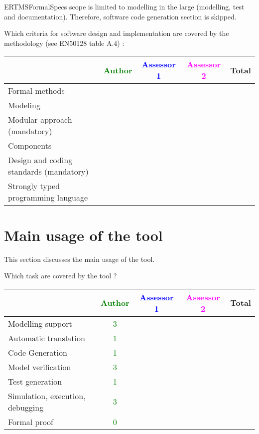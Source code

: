 \begin{author_comment}
ERTMSFormalSpecs scope is limited to modelling in the large (modelling, test and documentation). Therefore, software code generation section is skipped.  
\end{author_comment}

Which criteria for software design and implementation are covered by the methodology
(see EN50128 table A.4) :

\begin{tabular}{|l | c | c | c | c|}
\hline
& \textcolor{green}{Author} & \textcolor{blue}{Assessor 1} & \textcolor{magenta}{Assessor 2} & Total \\
\hline
Formal methods  & & & &  \\
\hline 
Modeling  & & & &  \\
\hline
Modular approach (mandatory) & & & &  \\
\hline
Components & & & &  \\
\hline
Design and coding standards (mandatory) & & & &  \\
\hline
Strongly typed programming language & & & &  \\
\hline

\end{tabular}



\section{Main usage of the tool}
\label{main_usage}

This section discusses the main usage of the tool.

Which task are covered by the tool ?


\begin{tabular}{|l | c | c | c | c|}
\hline
& \textcolor{green}{Author} & \textcolor{blue}{Assessor 1} & \textcolor{magenta}{Assessor 2} & Total \\
\hline 
Modelling support & \textcolor{green}{3} & & &  \\
\hline
Automatic translation  & \textcolor{green}{1} & & & \\
\hline
Code Generation  & \textcolor{green}{1} & & & \\
\hline
Model verification & \textcolor{green}{3} & & & \\
\hline
Test generation & \textcolor{green}{1} & & & \\
\hline
Simulation, execution, debugging & \textcolor{green}{3} & & & \\
\hline
Formal proof & \textcolor{green}{0} & & & \\
\hline
\end{tabular}

